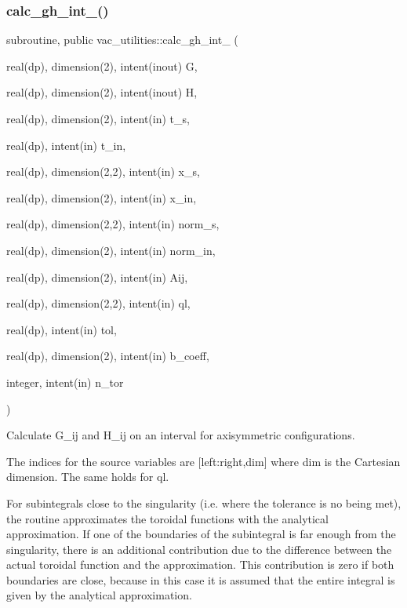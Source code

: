 \subsubsection{\texorpdfstring{calc\+\_\+gh\+\_\+int\+\_()}{calc\_gh\_int\_2()}}
{\footnotesize\ttfamily subroutine, public vac\+\_\+utilities\+::calc\+\_\+gh\+\_\+int\+\_ (\begin{DoxyParamCaption}\item[{real(dp), dimension(2), intent(inout)}]{G,  }\item[{real(dp), dimension(2), intent(inout)}]{H,  }\item[{real(dp), dimension(2), intent(in)}]{t\+\_\+s,  }\item[{real(dp), intent(in)}]{t\+\_\+in,  }\item[{real(dp), dimension(2,2), intent(in)}]{x\+\_\+s,  }\item[{real(dp), dimension(2), intent(in)}]{x\+\_\+in,  }\item[{real(dp), dimension(2,2), intent(in)}]{norm\+\_\+s,  }\item[{real(dp), dimension(2), intent(in)}]{norm\+\_\+in,  }\item[{real(dp), dimension(2), intent(in)}]{Aij,  }\item[{real(dp), dimension(2,2), intent(in)}]{ql,  }\item[{real(dp), intent(in)}]{tol,  }\item[{real(dp), dimension(2), intent(in)}]{b\+\_\+coeff,  }\item[{integer, intent(in)}]{n\+\_\+tor }\end{DoxyParamCaption})}



Calculate G\+\_\+ij and H\+\_\+ij on an interval for axisymmetric configurations. 

The indices for the source variables are {\ttfamily \mbox{[}left\+:right,dim\mbox{]}} where {\ttfamily dim} is the Cartesian dimension. The same holds for {\ttfamily ql}.

For subintegrals close to the singularity (i.\+e. where the tolerance is no being met), the routine approximates the toroidal functions with the analytical approximation. If one of the boundaries of the subintegral is far enough from the singularity, there is an additional contribution due to the difference between the actual toroidal function and the approximation. This contribution is zero if both boundaries are close, because in this case it is assumed that the entire integral is given by the analytical approximation.

